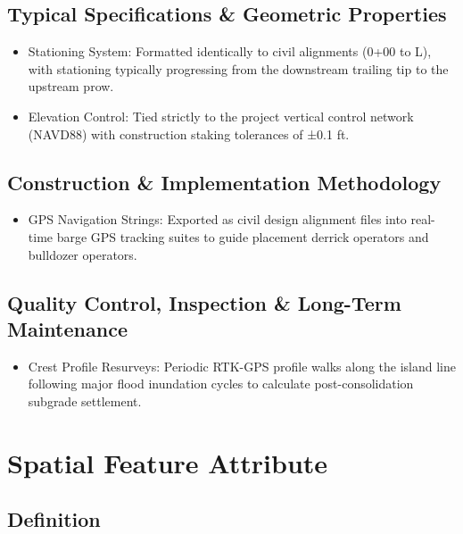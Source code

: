 \documentclass[
  letterpaper,
  DIV=11,
  numbers=noendperiod]{scrreprt}
\providecommand{\tightlist}{%
  \setlength{\itemsep}{0pt}\setlength{\parskip}{0pt}}
\begin{document}
\subsection{Typical Specifications \& Geometric
Properties}\label{typical-specifications-geometric-properties}

\begin{itemize}
\item
  Stationing System: Formatted identically to civil alignments (0+00 to
  L), with stationing typically progressing from the downstream trailing
  tip to the upstream prow.
\item
  Elevation Control: Tied strictly to the project vertical control
  network (NAVD88) with construction staking tolerances of ±0.1 ft.
\end{itemize}

\subsection{Construction \& Implementation
Methodology}\label{construction-implementation-methodology-6}

\begin{itemize}
\tightlist
\item
  GPS Navigation Strings: Exported as civil design alignment files into
  real-time barge GPS tracking suites to guide placement derrick
  operators and bulldozer operators.
\end{itemize}

\subsection{Quality Control, Inspection \& Long-Term
Maintenance}\label{quality-control-inspection-long-term-maintenance-6}

\begin{itemize}
\tightlist
\item
  Crest Profile Resurveys: Periodic RTK-GPS profile walks along the
  island line following major flood inundation cycles to calculate
  post-consolidation subgrade settlement.
\end{itemize}

\section{Spatial Feature Attribute}\label{spatial-feature-attribute-5}

\subsection{Definition}\label{definition-6}
\end{document}
